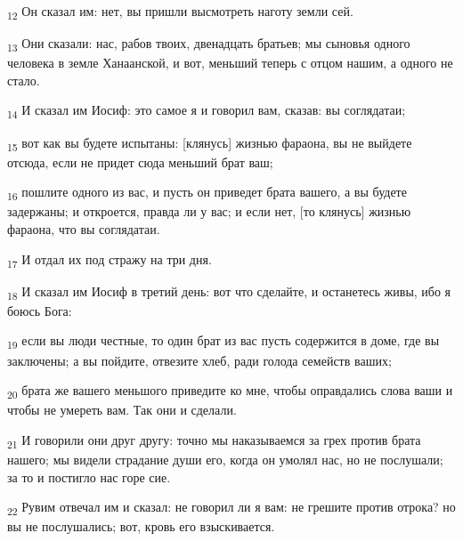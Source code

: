\begin{tcolorbox}
\textsubscript{12} Он сказал им: нет, вы пришли высмотреть наготу земли сей.
\end{tcolorbox}
\begin{tcolorbox}
\textsubscript{13} Они сказали: нас, рабов твоих, двенадцать братьев; мы сыновья одного человека в земле Ханаанской, и вот, меньший теперь с отцом нашим, а одного не стало.
\end{tcolorbox}
\begin{tcolorbox}
\textsubscript{14} И сказал им Иосиф: это самое я и говорил вам, сказав: вы соглядатаи;
\end{tcolorbox}
\begin{tcolorbox}
\textsubscript{15} вот как вы будете испытаны: [клянусь] жизнью фараона, вы не выйдете отсюда, если не придет сюда меньший брат ваш;
\end{tcolorbox}
\begin{tcolorbox}
\textsubscript{16} пошлите одного из вас, и пусть он приведет брата вашего, а вы будете задержаны; и откроется, правда ли у вас; и если нет, [то клянусь] жизнью фараона, что вы соглядатаи.
\end{tcolorbox}
\begin{tcolorbox}
\textsubscript{17} И отдал их под стражу на три дня.
\end{tcolorbox}
\begin{tcolorbox}
\textsubscript{18} И сказал им Иосиф в третий день: вот что сделайте, и останетесь живы, ибо я боюсь Бога:
\end{tcolorbox}
\begin{tcolorbox}
\textsubscript{19} если вы люди честные, то один брат из вас пусть содержится в доме, где вы заключены; а вы пойдите, отвезите хлеб, ради голода семейств ваших;
\end{tcolorbox}
\begin{tcolorbox}
\textsubscript{20} брата же вашего меньшого приведите ко мне, чтобы оправдались слова ваши и чтобы не умереть вам. Так они и сделали.
\end{tcolorbox}
\begin{tcolorbox}
\textsubscript{21} И говорили они друг другу: точно мы наказываемся за грех против брата нашего; мы видели страдание души его, когда он умолял нас, но не послушали; за то и постигло нас горе сие.
\end{tcolorbox}
\begin{tcolorbox}
\textsubscript{22} Рувим отвечал им и сказал: не говорил ли я вам: не грешите против отрока? но вы не послушались; вот, кровь его взыскивается.
\end{tcolorbox}
